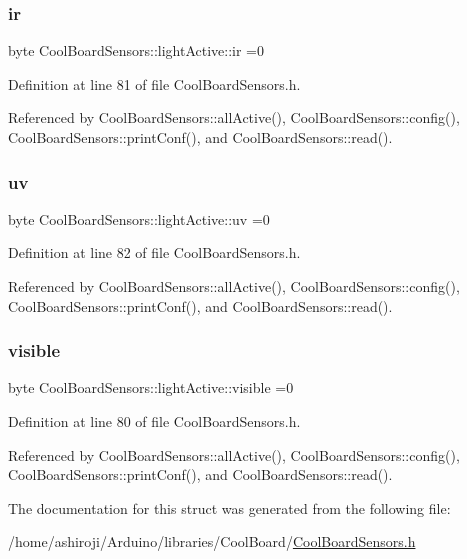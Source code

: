 \subsubsection{\texorpdfstring{ir}{ir}}
{\footnotesize\ttfamily byte Cool\+Board\+Sensors\+::light\+Active\+::ir =0}



Definition at line 81 of file Cool\+Board\+Sensors.\+h.



Referenced by Cool\+Board\+Sensors\+::all\+Active(), Cool\+Board\+Sensors\+::config(), Cool\+Board\+Sensors\+::print\+Conf(), and Cool\+Board\+Sensors\+::read().

\mbox{\label{structCoolBoardSensors_1_1lightActive_a949a7aaf5166d981de8fe0fd93da20d6}} 
\subsubsection{\texorpdfstring{uv}{uv}}
{\footnotesize\ttfamily byte Cool\+Board\+Sensors\+::light\+Active\+::uv =0}



Definition at line 82 of file Cool\+Board\+Sensors.\+h.



Referenced by Cool\+Board\+Sensors\+::all\+Active(), Cool\+Board\+Sensors\+::config(), Cool\+Board\+Sensors\+::print\+Conf(), and Cool\+Board\+Sensors\+::read().

\mbox{\label{structCoolBoardSensors_1_1lightActive_abcbba296b6a95e67c0cd2555d9dd50c7}} 
\subsubsection{\texorpdfstring{visible}{visible}}
{\footnotesize\ttfamily byte Cool\+Board\+Sensors\+::light\+Active\+::visible =0}



Definition at line 80 of file Cool\+Board\+Sensors.\+h.



Referenced by Cool\+Board\+Sensors\+::all\+Active(), Cool\+Board\+Sensors\+::config(), Cool\+Board\+Sensors\+::print\+Conf(), and Cool\+Board\+Sensors\+::read().



The documentation for this struct was generated from the following file\+:\begin{DoxyCompactItemize}
\item 
/home/ashiroji/\+Arduino/libraries/\+Cool\+Board/\hyperlink{CoolBoardSensors_8h}{Cool\+Board\+Sensors.\+h}\end{DoxyCompactItemize}
